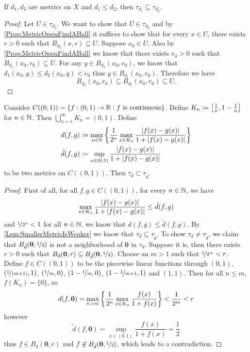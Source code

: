 \documentclass[screen,single]{techreport}
\numberwithin{equation}{section}
\begin{document}
\begin{lemma}\label{Lem:SmallerMetricIsWeaker}
	If $d_1,d_2$ are metrics on $X$ and $d_1 \le d_2$, then $\tau_{d_1} \subseteq \tau_{d_2}$.
\end{lemma}
\begin{proof}
	Let $U \in \tau_{d_1}$.
	We want to show that $U \in \tau_{d_2}$ and by \cref{Prop:MetricOpenFindABall} it suffices to show that for every $x \in U$, there exists $r >0$ such that $B_{d_2}(x,r) \subseteq U$.
	Suppose $x_0 \in U$.
	Also by \cref{Prop:MetricOpenFindABall} we know that there exists $r_0 > 0$ such that $B_{d_1}(x_0,r_0) \subseteq U$.
	For any $y \in B_{d_2}(x_0,r_0)$, we know that $d_1(x_0,y) \le d_2(x_0,y) < r_0$ thus $y \in B_{d_1}(x_0,r_0)$.
	Therefore we have
	\[
	B_{d_2}(x_0,r_0) \subseteq B_{d_1}(x_0,r_0) \subseteq U.
	\]
\end{proof}

\begin{proposition}\label{Prop:SmallerMetricIndeedWeaker}
	Consider $C((0,1)) = \{ f : (0,1) \to \mathbb{R} : f~\text{is continuous} \}$.
	Define $K_n \coloneqq \left[{\frac{1}{n}, 1-\frac{1}{n}}\right]$ for $n \in \mathbb{N}$.
	Then $\bigcup_{n=1}^\infty K_n = (0,1)$.
	Define
	\begin{align*}
		d(f,g) & \coloneqq \max_{n \in \mathbb{N}} \left\{ { \frac{1}{2^n} \max_{x \in K_n} \frac{\left|{f(x)-g(x)}\right|}{1+\left|{f(x)-g(x)}\right|} } \right\} \\
		\tilde{d}(f,g) & \coloneqq  \sup_{x \in (0,1)} \frac{\left|{f(x)-g(x)}\right|}{1+\left|{f(x)-g(x)}\right|}
	\end{align*}
	to be two metrics on $C((0,1))$.
	Then $\tau_d \subset \tau_{\tilde{d}}$.
\end{proposition}
\begin{proof}
	First of all, for all $f,g \in C((0,1))$, for every $n \in \mathbb{N}$, we have
	\[
	\max_{x \in K_n} \frac{\left|{f(x)-g(x)}\right|}{1+\left|{f(x)-g(x)}\right|} \le \tilde{d}(f,g)
	\]
	and $\nicefrac{1}{2^n} < 1$ for all $n \in \mathbb{N}$, we know that $d(f,g) \le \tilde{d}(f,g)$.
	By \cref{Lem:SmallerMetricIsWeaker} we know that $\tau_d \subseteq \tau_{\tilde{d}}$.
	To show $\tau_d \neq \tau_{\tilde{d}}$, we claim that $B_{\tilde{d}}(\mathbf{0},\nicefrac{1}{2})$ is not a neighborhood of $\mathbf{0}$ in $\tau_d$.
	Suppose it is, then there exists $r > 0$ such that $B_d(\mathbf{0},r) \subseteq B_{\tilde{d}}(\mathbf{0},\nicefrac{1}{2})$.
	Choose an $m >1$ such that $\nicefrac{1}{2^m} < r$.
	Define $f \in C((0,1))$ to be the piecewise linear functions through $(0,1)$, $(\nicefrac{1}{(m+1)},1)$, $(\nicefrac{1}{m},0)$, $(1-\nicefrac{1}{m},0)$, $(1-\nicefrac{1}{m+1},1)$ and $(1,1)$.
	Then for all $n \le m$, $f(K_n) = \{0\}$, so
	\[
	d(f,\mathbf{0})  = \max_{n > m} \left\{ { \frac{1}{2^n} \max_{x \in K_n} \frac{f(x)}{1+f(x)}  } \right\} < \frac{1}{2^m} < r
	\]
	however
	\[
	\tilde{d}(f,\mathbf{0}) = \sup_{x \in (0,1)} \frac{f(x)}{1+f(x)} = \frac{1}{2}
	\]
	thus $f \in B_d(\mathbf{0},r)$ and $f \not\in B_{\tilde{d}}(\mathbf{0}, \nicefrac{1}{2})$, which leads to a contradiction.
\end{proof}
\end{document}
